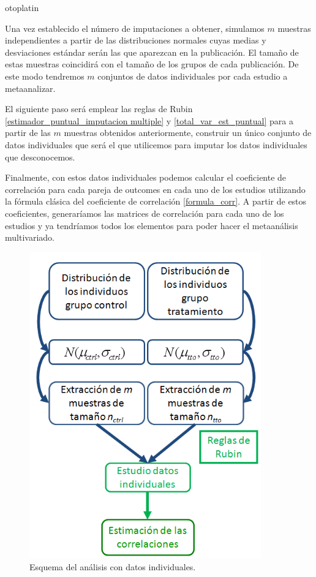 otoplatin\documentclass[a4paper,openright,12pt]{report}
\begin{document}
Una vez establecido el número de imputaciones a obtener, simulamos $m$ muestras independientes a partir de las distribuciones normales cuyas medias y desviaciones estándar serán las que aparezcan en la publicación. El tamaño de estas muestras coincidirá con el tamaño de los grupos de cada publicación. De este modo tendremos $m$ conjuntos de datos individuales por cada estudio a metaanalizar.

El siguiente paso será emplear las reglas de Rubin \ref{estimador_puntual_imputacion multiple} y \ref{total_var_est_puntual} para a partir de las $m$ muestras obtenidos anteriormente, construir un único conjunto de datos individuales que será el que utilicemos para imputar los datos individuales que desconocemos. 

Finalmente, con estos datos individuales podemos calcular el coeficiente de correlación para cada pareja de outcomes en cada uno de los estudios utilizando la fórmula clásica del coeficiente de correlación \ref{formula_corr}. A partir de estos coeficientes, generaríamos las matrices de correlación para cada uno de los estudios y ya tendríamos todos los elementos para poder hacer el metaanálisis multivariado.

\begin{figure}[t]
\begin{center}
\includegraphics[width=10cm]{Perspectiva2}
\caption{Esquema del análisis con datos individuales.}
\label{Perspectiva2}
\end{center}
\end{figure}
\end{document}
